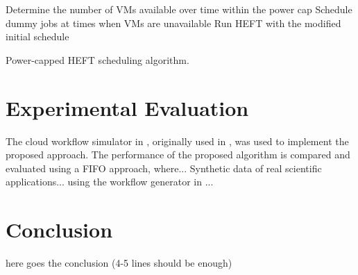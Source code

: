 \documentclass[10pt, conference, compsocconf]{IEEEtran} %
\begin{document}
\begin{algorithm}
  \begin{algorithmic}[1]
    \State Determine the number of VMs available over time within the power cap
    \State Schedule dummy jobs at times when VMs are unavailable
    \State Run HEFT with the modified initial schedule


  \end{algorithmic}
  \caption{Power-capped HEFT scheduling algorithm.}
  \label{alg:power-capped-heft}
\end{algorithm}

\section{Experimental Evaluation}
The cloud workflow simulator in \cite{CloudWorkflowSimulator}, originally used in \cite{malawski2012cost}, was used to implement the proposed approach. The performance of the proposed algorithm is compared and evaluated using a FIFO approach, where... Synthetic data of real scientific applications... using the workflow generator in \cite{WorkflowGenerator}...


\section{Conclusion}

here goes the conclusion (4-5 lines should be enough)



\end{document}

